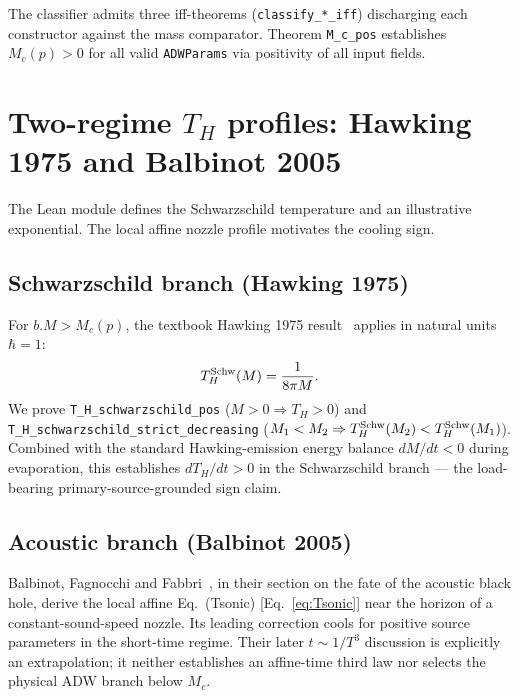 \documentclass[prd,aps,twocolumn,floatfix,nofootinbib,superscriptaddress]{revtex4-2}
\newcommand{\Mc}{M_{c}}
\newcommand{\Thawk}{T_{H}}
\begin{document}
The classifier admits three iff-theorems
(\texttt{classify\_*\_iff}) discharging each constructor against the
mass comparator. Theorem \texttt{M\_c\_pos} establishes
$\Mc(p) > 0$ for all valid \texttt{ADWParams} via positivity of all
input fields.

\section{Two-regime $\Thawk$ profiles: Hawking 1975 and Balbinot 2005}
\label{sec:profiles}

The Lean module defines the Schwarzschild temperature and an illustrative
exponential. The local affine nozzle profile motivates the cooling sign.

\subsection{Schwarzschild branch (Hawking 1975)}

For $b.M > \Mc(p)$, the textbook Hawking 1975 result~\cite{Hawking1975CMP}
applies in natural units $\hbar = 1$:
\begin{equation}
\Thawk^{\rm Schw}(M) = \frac{1}{8\pi M}.
\label{eq:Tsch}
\end{equation}
We prove \texttt{T\_H\_schwarzschild\_pos} ($M > 0 \Rightarrow \Thawk > 0$)
and \texttt{T\_H\_schwarzschild\_strict\_decreasing}
($M_1 < M_2 \Rightarrow \Thawk^{\rm Schw}(M_2) < \Thawk^{\rm Schw}(M_1)$).
Combined with the standard Hawking-emission energy balance
$dM/dt < 0$ during evaporation, this establishes
$d\Thawk/dt > 0$ in the Schwarzschild branch ---
the load-bearing primary-source-grounded sign claim.

\subsection{Acoustic branch (Balbinot 2005)}

Balbinot, Fagnocchi and Fabbri~\cite{Balbinot2005PRD}, in their
section on the fate of the acoustic black hole, derive the local affine
Eq.~(Tsonic) [Eq.~\ref{eq:Tsonic}] near the horizon of a
constant-sound-speed nozzle. Its leading correction cools for positive
source parameters in the short-time regime. Their later
$t \sim 1/T^3$ discussion is explicitly an extrapolation; it neither
establishes an affine-time third law nor selects the physical ADW
branch below $\Mc$.
\end{document}
